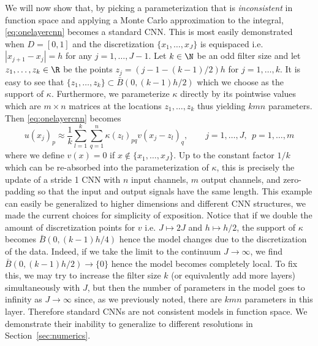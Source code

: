 We will now show that, by picking a parameterization that is \textit{inconsistent} 
in function space and applying a Monte Carlo approximation to the integral, \eqref{eq:onelayercnn}  becomes a standard CNN. This is most easily demonstrated when \(D = [0,1]\) and the discretization \(\{x_1,\dots,x_J\}\) is equispaced i.e. \(|x_{j+1} - x_j| = h\) for any \(j=1,\dots,J-1\). Let \(k \in \N\) be an odd filter size 
and let \(z_1,\dots,z_k \in \R\) be the points \(z_j = (j-1-(k-1)/2)h\) for \(j=1,\dots,k\). It is easy to see that \(\{z_1,\dots,z_k\} \subset \bar{B}(0,(k-1)h/2)\) which we choose as the support of \(\kappa\). Furthermore, we parameterize \(\kappa\) directly by its pointwise values which are \(m \times n\) matrices at the locations \(z_1,\dots,z_k\) thus yielding \(kmn\) parameters. Then \eqref{eq:onelayercnn} becomes
\[u(x_j)_p \approx \frac{1}{k} \sum_{l=1}^k \sum_{q=1}^n \kappa(z_l)_{pq} v(x_j - z_l)_q, \qquad j=1,\dots,J, \:\: p=1,\dots,m\]
where we define \(v(x) = 0\) if \(x \not \in \{x_1,\dots,x_J\}\). Up to the constant factor \(1/k\) which can be re-absorbed into the parameterization of \(\kappa\), this is precisely the update of a stride 1 CNN with \(n\) input channels, \(m\) output channels, and zero-padding so that the input and output signals have the same length. This example can easily be generalized to higher dimensions and different CNN structures, we made the current choices for simplicity of exposition. Notice that if we double the amount of discretization points for \(v\) i.e. \(J \mapsto 2J\) and \(h \mapsto h/2\), the support of \(\kappa\) becomes \(\bar{B}(0,(k-1)h/4)\) hence the model changes due to the discretization of the data. Indeed, if we take the limit to the continuum \(J \to \infty\), we find \(\bar{B}(0,(k-1)h/2) \to \{0\}\) hence the model becomes completely local. To fix this, we may try to increase the filter size \(k\) (or equivalently add more layers) simultaneously with \(J\), but then the number of parameters in the model goes to infinity as \(J \to \infty\) since, as we previously noted, there are \(kmn\) parameters in this layer. Therefore standard CNNs are not consistent models in function space. We demonstrate their inability to generalize to different resolutions in Section~\ref{sec:numerics}.

